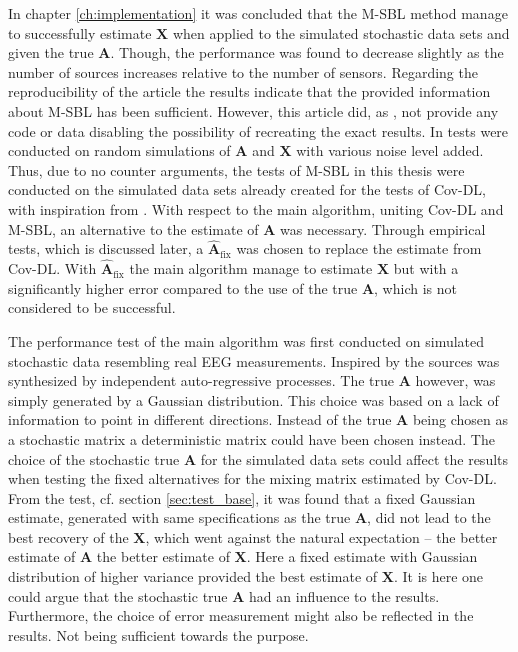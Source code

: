 In chapter \ref{ch:implementation} it was concluded that the M-SBL method manage to successfully estimate $\mathbf{X}$ when applied to the simulated stochastic data sets and given the true $\mathbf{A}$. 
Though, the performance was found to decrease slightly as the number of sources increases relative to the number of sensors. 
Regarding the reproducibility of the article \cite{Balkan2014} the results indicate that the provided information about M-SBL has been sufficient.
However, this article did, as \cite{Balkan2015}, not provide any code or data disabling the possibility of recreating the exact results. In \cite{Balkan2014} tests were conducted on random simulations of $\mathbf{A}$ and $\mathbf{X}$ with various noise level added. 
Thus, due to no counter arguments, the tests of M-SBL in this thesis were conducted on the simulated data sets already created for the tests of Cov-DL, with inspiration from \cite{Balkan2015}.
With respect to the main algorithm, uniting Cov-DL and M-SBL, an alternative to the estimate of $\mathbf{A}$ was necessary. 
Through empirical tests, which is discussed later, a $\hat{\mathbf{A}}_{\text{fix}}$ was chosen to replace the estimate from Cov-DL. 
With $\hat{\mathbf{A}}_{\text{fix}}$ the main algorithm manage to estimate $\mathbf{X}$ but with a significantly higher error compared to the use of the true $\mathbf{A}$, which is not considered to be successful.

The performance test of the main algorithm was first conducted on simulated stochastic data resembling real EEG measurements. 
Inspired by \cite{Balkan2015} the sources was synthesized by independent auto-regressive processes. 
The true $\mathbf{A}$ however, was simply generated by a Gaussian distribution. 
This choice was based on a lack of information to point in different directions. 
Instead of the true $\mathbf{A}$ being chosen as a stochastic matrix a deterministic matrix could have been chosen instead. 
The choice of the stochastic true $\mathbf{A}$ for the simulated data sets could affect the results when testing the fixed alternatives for the mixing matrix estimated by Cov-DL. 
From the test, cf. section \ref{sec:test_base}, it was found that a fixed Gaussian estimate, generated with same specifications as the true $\mathbf{A}$, did not lead to the best recovery of the $\mathbf{X}$, which went against the natural expectation -- the better estimate of $\mathbf{A}$ the better estimate of $\mathbf{X}$. 
Here a fixed estimate with Gaussian distribution of higher variance provided the best estimate of $\mathbf{X}$. 
It is here one could argue that the stochastic true $\mathbf{A}$ had an influence to the results. 
Furthermore, the choice of error measurement might also be reflected in the results. Not being sufficient towards the purpose. 

